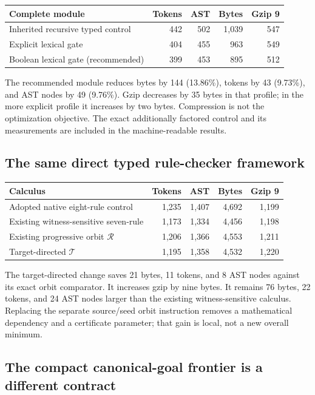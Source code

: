 \documentclass[11pt,a4paper]{article}
\theoremstyle{definition}\newtheorem{definition}[theorem]{Definition}
\begin{document}
\begin{center}\small
\begin{tabular}{lrrrr}
\toprule
Complete module & Tokens & AST & Bytes & Gzip 9\\
\midrule
Inherited recursive typed control & 442 & 502 & 1,039 & 547\\
Explicit lexical gate & 404 & 455 & 963 & 549\\
Boolean lexical gate (recommended) & 399 & 453 & 895 & 512\\
\bottomrule
\end{tabular}
\end{center}
The recommended module reduces bytes by 144 (13.86\%), tokens by 43
(9.73\%), and AST nodes by 49 (9.76\%). Gzip decreases by 35 bytes in
that profile; in the more explicit profile it increases by two bytes.
Compression is not the optimization objective. The exact additionally
factored control and its measurements are included in the machine-readable
results.

\subsection{The same direct typed rule-checker framework}

\begin{center}\small
\begin{tabular}{lrrrr}
\toprule
Calculus & Tokens & AST & Bytes & Gzip 9\\
\midrule
Adopted native eight-rule control & 1,235 & 1,407 & 4,692 & 1,199\\
Existing witness-sensitive seven-rule & 1,173 & 1,334 & 4,456 & 1,198\\
Existing progressive orbit $\mathcal R$ & 1,206 & 1,366 & 4,553 & 1,211\\
Target-directed $\mathcal T$ & 1,195 & 1,358 & 4,532 & 1,220\\
\bottomrule
\end{tabular}
\end{center}
The target-directed change saves 21 bytes, 11 tokens, and 8 AST nodes
against its exact orbit comparator. It increases gzip by nine bytes.
It remains 76 bytes, 22 tokens, and 24 AST nodes larger than the existing
witness-sensitive calculus. Replacing the separate source/seed orbit
instruction removes a mathematical dependency and a certificate parameter;
that gain is local, not a new overall minimum.

\subsection{The compact canonical-goal frontier is a different contract}
\end{document}
